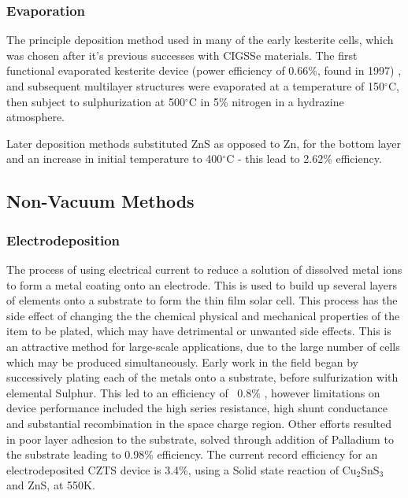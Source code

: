 \documentclass[11pt,a4paper,twoside]{article}
\begin{document}
\subsubsection{Evaporation}

The principle deposition method used in many of the early kesterite cells, which was chosen after it's previous successes with CIGSSe materials.
The first functional evaporated kesterite device (power efficiency of 0.66\%, found in 1997) , and subsequent multilayer structures were evaporated at a temperature of 150$^\circ$C, then subject to sulphurization at 500$^\circ$C in 5\% nitrogen in a hydrazine atmosphere.

Later deposition methods substituted ZnS as opposed to Zn, for the bottom layer and an increase in initial temperature to 400$^\circ$C - this lead to 2.62\% efficiency.\citep{Todorov2010}
\subsection{Non-Vacuum Methods}
\subsubsection{Electrodeposition}
The process of using electrical current to reduce a solution of dissolved metal ions to form a metal coating onto an electrode. This is used to build up several layers of elements onto a substrate to form the thin film solar cell. This process has the side effect of changing the the chemical physical and mechanical properties of the item to be plated, which may have detrimental or unwanted side effects. This is an attractive method for large-scale applications, due to the large number of cells which may be produced simultaneously. Early work in the field began by successively plating each of the metals onto a substrate, before sulfurization with elemental Sulphur. This led to an efficiency of ~0.8\% \citep{Scragg2008}, however limitations on device performance included the high series resistance, high shunt conductance and substantial recombination in the space charge region. Other efforts resulted in poor layer adhesion to the substrate, solved through addition of Palladium to the substrate leading to 0.98\% efficiency. The current record efficiency for an electrodeposited CZTS device is 3.4\%, using a Solid state reaction of Cu$_2$SnS$_3$ and ZnS, at 550K.
\end{document}
